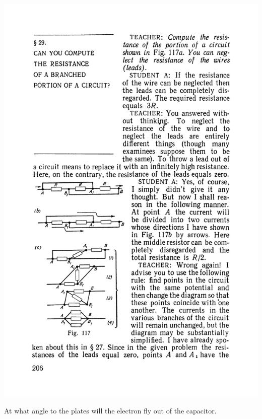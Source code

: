 \documentclass[a4paper,sfsidenotes]{tufte-book}
\begin{document}
\begin{marginfigure}[6cm]
\centering
\includegraphics[width=\linewidth]{fig-117a}
\caption{ At what angle to the plates will the electron fly out of the capacitor.}
\label{fig-117}
\end{marginfigure}
\end{document}
